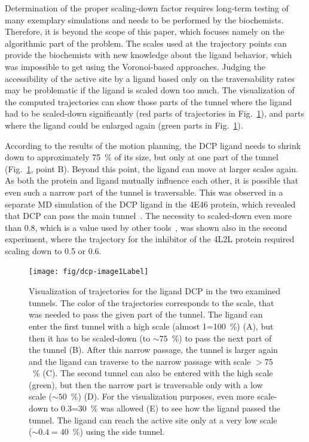 \documentclass{bmcart}
\begin{document}
Determination of the proper scaling-down factor requires long-term testing of many exemplary simulations and needs to be performed by the biochemists. 
Therefore, it is beyond the scope of this paper, which focuses namely on the algorithmic part of the problem.
The scales used at the trajectory points can provide the biochemists with new knowledge about the ligand behavior, which was impossible to get using the Voronoi-based approaches.
Judging the accessibility of the active site by a ligand based only on the traversability rates may be problematic if the ligand is scaled down too much.
The visualization of the computed trajectories can show those parts of the tunnel where the ligand had to be scaled-down significantly (red parts of trajectories in Fig.~\ref{fig::dcp}), and parts where the ligand could be enlarged again (green parts in Fig.~\ref{fig::dcp}).

According to the results of the motion planning, the DCP ligand needs to shrink down to approximately 75~\% of its size, but only at one part of the tunnel (Fig.~\ref{fig::dcp}, point B). 
Beyond this point, the ligand can move at larger scales again.
As both the protein and ligand mutually influence each other, it is possible that even such a narrow part of the tunnel is traversable.
This was observed in a separate MD simulation of the DCP ligand in the 4E46 protein, which revealed that DCP can pass the main tunnel~\cite{marques2017catalytic}. 
The necessity to scaled-down even more than 0.8, which is a value used by other tools~\cite{cortes2010simulating}, was
shown also in the second experiment, where the trajectory for the inhibitor of the 4L2L protein required scaling down to 0.5 or 0.6.


\begin{figure}
\centering
\vskip -5pt
\texttt{[image: fig/dcp-image1Label]}\\
\vspace{-5pt}
\caption{\label{fig::dcp}
    \small
Visualization of trajectories for the ligand DCP in the two examined tunnels.  
The color of the trajectories corresponds to the scale, that was needed to pass the given part of the tunnel.
The ligand can enter the first tunnel with a high scale (almost 1=100~\%) (A), but then it has to be scaled-down (to $\sim75$~\%) to pass the
next part of the tunnel (B). After this narrow passage, the tunnel is larger again and the ligand can traverse to the narrow passage with
scale $>75$~\% (C).
The second tunnel can also be entered with the high scale (green), but then the narrow part is traversable only with a low scale ($\sim50$~\%) (D). 
For the visualization purposes, even more scale-down to 0.3=30~\% was allowed (E) to see how the ligand passed the tunnel.
The ligand can reach the active site only at a very low scale ($\sim0.4=40$~\%) using the side tunnel.
}
\end{figure}
\end{document}
